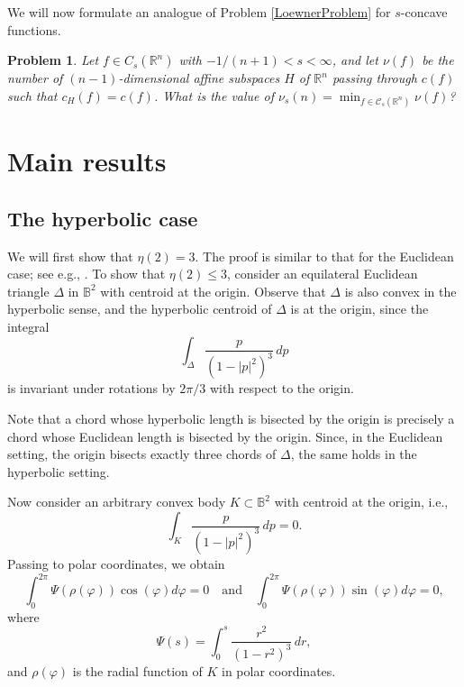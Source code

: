 \documentclass[12pt,letterpaper,reqno]{amsart}
\newtheorem{problem}[theorem]{Problem}
\theoremstyle{definition}
\begin{document}
 

We will now formulate an analogue of Problem \ref{LoewnerProblem} for $s$-concave functions.


\begin{problem}\label{FunctionalProblem}
	Let $f \in C_s({\mathbb R}^n)$ with $-1/(n+1) <s<\infty$, and let $\nu(f)$ be the number of   $(n-1)$-dimensional affine subspaces $H$ of $\mathbb R^n$ passing through $c(f)$ such that $c_H(f)=c(f)$.  What is the value of $\nu_s(n) =\displaystyle \min_{f\in \mathcal C_s({\mathbb R}^n)} \nu(f)$?  
\end{problem}
 


\section{Main results}
\subsection{The hyperbolic case}\label{Section:H}

We will first show that $\eta (2)=3$. The proof is similar to that for the Euclidean case; see e.g., \cite[Section~2]{MTY2}.
To show that $\eta(2)\le 3$, consider an equilateral Euclidean triangle $\Delta$ in $\mathbb B^2$ with centroid at the origin. Observe that $\Delta$ is also convex in the hyperbolic sense, and the hyperbolic centroid of $\Delta$ is  at the origin, since the integral
$$
\int_{\Delta}\frac{p}{(1-|p|^2)^{3}}\,dp
$$ is invariant under rotations by $2\pi/3$ with respect to the origin.

Note that a chord whose hyperbolic length is bisected by the origin is precisely a chord whose Euclidean length is bisected by the origin. Since, in the Euclidean setting, the origin bisects exactly three chords of $\Delta$, the same holds in the hyperbolic setting.


Now consider an arbitrary convex body $K\subset \mathbb B^2$ with centroid at the origin, i.e.,
$$
\int_{K}\frac{p}{(1-|p|^2)^{3}}\,dp=0.
$$
Passing to polar coordinates, we obtain
\begin{equation*}
	\int_0^{2\pi} \Psi(\rho(\varphi)) \cos(\varphi) d\varphi = 0 \quad \text{and} \quad  \int_0^{2\pi}  \Psi(\rho(\varphi)) \sin(\varphi) d\varphi = 0,
\end{equation*}
where $$\Psi (s) = \int_0^s\frac{r^2}{(1-r^2)^3}\, dr,$$
and $\rho(\varphi)$ is the radial function of $K$   in polar coordinates.
\end{document}
